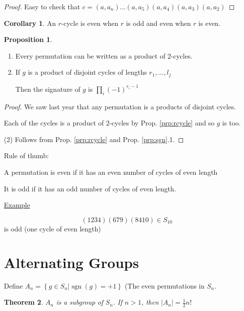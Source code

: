 \documentclass{article}
\newtheorem{theorem}{Theorem}[section]
\theoremstyle{definition}
\newtheorem{proposition}{Proposition}
\newtheorem{corollary}[theorem]{Corollary}
\DeclareMathOperator{\sgn}{sgn}
\begin{document}
\begin{proof}
  Easy to check that
    $c=(a,a_n)\ldots(a,a_5)(a,a_4)(a,a_3)(a,a_2)$
\end{proof}

\begin{corollary}
  An $r$-cycle is even when $r$ is odd and even when $r$ is even.
\end{corollary}

\begin{proposition}
  \begin{enumerate}
    \item Every permutation can be written as a product of 2-cycles.
    \item If $g$ is a product of disjoint cycles of lengths $r_1, \ldots, l_j$

      Then the signature of $g$ is $\prod_{i} (-1)^{r_i - 1}$
  \end{enumerate}
\end{proposition}

\begin{proof}
  We saw last year that any permutation is a products of disjoint cycles.

  Each of the cycles is a product of 2-cycles by Prop. \ref{prp:rcycle} and so $g$ is too.

  (2) Follows from Prop. \ref{prp:rcycle} and Prop. \ref{prp:sgn}.1.
\end{proof}

Rule of thumb:

A permutation is even if it has an even number of cycles of even length

It is odd if it has an odd number of cycles of even length.

\underline{Example}

$$(1 2 3 4)(6 7 9)(8 4 10) \in S_{10}$$ is odd (one cycle of even length)

\section{Alternating Groups}

Define $A_n=\left\{ g \in S_n | \sgn(g) = +1 \right\}$ (The even permutations
 in $S_n$.

\begin{theorem}
  $A_n$ is a subgroup of $S_n$. If $n>1$, then $|A_n|=\frac{1}{2}n!$
  \label{thm:subgroup}
\end{theorem}
\end{document}
